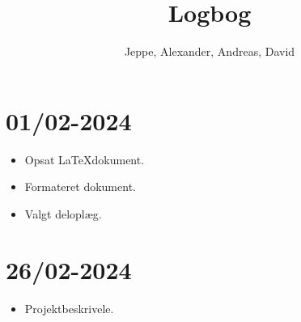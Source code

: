 \documentclass[12pt, a4paper]{article}
\title{Logbog}
\author{Jeppe, Alexander, Andreas, David}
\date{}
\begin{document}
    \maketitle
    \tableofcontents
    \newpage

    \section{01/02-2024}
        \begin{itemize}
            \item Opsat \LaTeX dokument.
            \item Formateret dokument.
            \item Valgt deloplæg.
        \end{itemize}

    \section{26/02-2024}
        \begin{itemize}
            \item Projektbeskrivele.
        \end{itemize}
        
\end{document}
